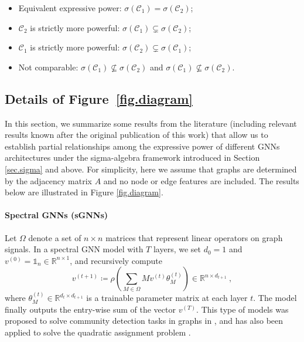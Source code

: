 \documentclass{article}
\begin{document}
\begin{itemize}
    \item Equivalent expressive power: $\sigma(\mathcal{C}_1) = \sigma(\mathcal{C}_2)$; 
    \item $\mathcal{C}_2$ is strictly more powerful: $\sigma(\mathcal{C}_1) \subsetneq \sigma(\mathcal{C}_2)$;
    \item $\mathcal{C}_1$ is strictly more powerful: $\sigma(\mathcal{C}_2) \subsetneq \sigma(\mathcal{C}_1)$;
    \item Not comparable: $\sigma(\mathcal{C}_1) \nsubseteq \sigma(\mathcal{C}_2)$ and $\sigma(\mathcal{C}_1) \nsubseteq \sigma(\mathcal{C}_2)$.
\end{itemize}

\subsection{Details of Figure~\ref{fig.diagram}}
\label{app:diagram}
In this section, we summarize some results from the literature (including relevant results known after the original publication of this work) that allow us to establish partial relationships among the expressive power of different GNNs architectures under the sigma-algebra framework introduced in Section \ref{sec.sigma} and above. For simplicity, here we assume that graphs are determined by the adjacency matrix $A$ and no node or edge features are included. The results below are illustrated in Figure \ref{fig.diagram}.

\paragraph{Spectral GNNs (sGNNs)} Let $\Omega$ denote a set of $n \times n$ matrices that represent linear operators on graph signals. 
In a spectral GNN model with $T$ layers, we set $d_0 = 1$ and $v^{(0)} = \mathds{1}_n \in \mathbb{R}^{n \times 1}$, and recursively compute
\begin{equation*}
    v^{(t+1)} \coloneqq \rho\left(\sum_{M\in \Omega} M v^{(t)} \theta_{M}^{(t)}\right) \in \mathbb{R}^{n \times d_{t+1}}~,
\end{equation*}
where $\theta_{M}^{(t)} \in \mathbb R^{d_t\times d_{t+1}}$ is a trainable parameter matrix at each layer $t$. The model finally outputs the entry-wise sum of the vector $v^{(T)}$.
This type of models was proposed to solve community detection tasks in graphs in \cite{chen2019cdsbm}, and has also been applied to solve the quadratic assignment problem \cite{nowak2017note}. 
\end{document}

